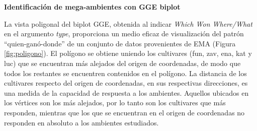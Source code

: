 

\textbf{Identificación de mega-ambientes con GGE biplot}

La vista poligonal del biplot GGE, obtenida al indicar \emph{Which Won Where/What} en el argumento \emph{type}, proporciona un medio eficaz de visualización del patrón ``quien-ganó-donde''  de un conjunto de datos provenientes de EMA (Figura \ref{fig:poligono}).  El polígono se obtiene uniendo los cultivares (fun, zav, ena, kat y luc) que se encuentran más alejados del origen de coordenadas, de modo que todos los restantes se encuentren contenidos en el polígono. La distancia de los cultivares respecto del origen de coordenadas, en sus respectivas direcciones, es una medida de la capacidad de respuesta a los ambientes. Aquellos ubicados en los vértices son los más alejados, por lo tanto son los cultivares que más responden, mientras que los que se encuentran en el origen de coordenadas no responden en absoluto a los ambientes estudiados.

